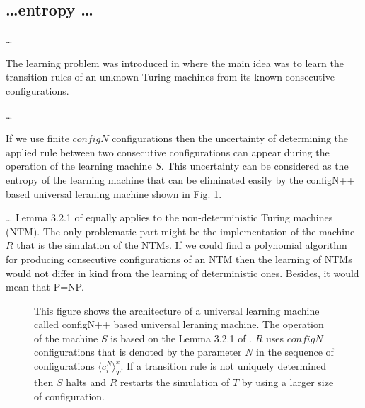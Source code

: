 \subsection{\dots entropy \dots}

\dots

The learning problem was introduced in \cite{TheorRobopsy} where the main idea was to learn the transition rules of an unknown Turing machines from its known consecutive configurations.

\dots

If we use finite $configN$ configurations then the uncertainty of determining the applied rule between two consecutive configurations can appear during the operation of the learning machine $S$. This uncertainty can be considered as the entropy of the learning machine that can be eliminated easily by the configN++ based universal leraning machine shown in Fig. \ref{fig_ULM}.

\dots
Lemma 3.2.1 of \cite{TheorRobopsy} equally applies to the non-deterministic Turing machines (NTM). The only problematic part might be the implementation of the machine $R$ that is the simulation of the NTMs. If we could find a polynomial algorithm for producing consecutive configurations of an NTM then the learning of NTMs would not differ in kind from the learning of deterministic ones. Besides, it would mean that P=NP.


\cite{Turing}
\cite{Neumann}
\cite{TheorRobopsy}
\cite{WhatIsLife}

\begin{figure}[!h]
\centering
\scalebox{1}{}
\caption{This figure shows the architecture of a universal learning machine called configN++ based universal leraning machine. The operation of the machine $S$ is based on the Lemma 3.2.1 of \cite{TheorRobopsy}. $R$ uses $configN$ configurations that is denoted by the parameter $N$ in the sequence of configurations ${\langle c^N_i\rangle}_T^x$. If a transition rule is not uniquely determined then $S$ halts and $R$ restarts the simulation of $T$ by using a larger size of configuration.\label{fig_ULM}}
\end{figure}
